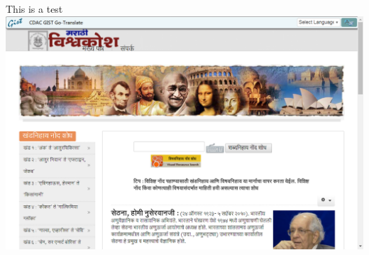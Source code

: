 \documentclass[10pt,legalpaper]{article}
\begin{document}
This is a test\\
\includegraphics[scale=0.3]{highlight.png} 
\end{document}

